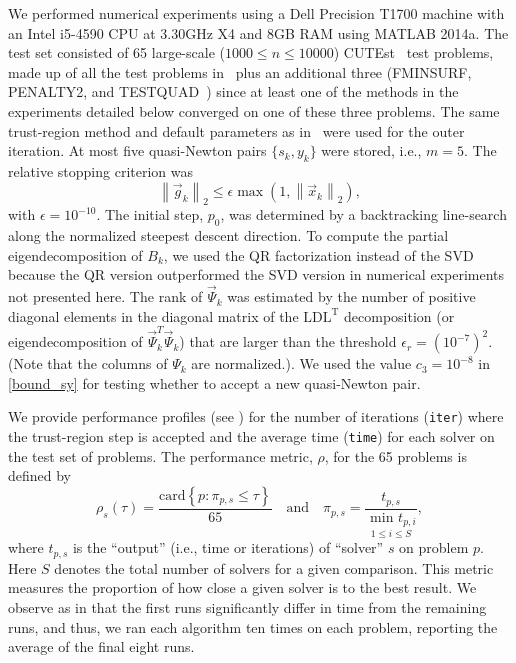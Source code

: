 We performed numerical experiments using a Dell Precision T1700 machine with an Intel i5-4590 {\small CPU} at $3.30${\small GH}z X4 and 8{\small GB RAM} using {\small MATLAB} 2014a.
The test set consisted of 
 65 large-scale ($1000\le n \le 10000$)
{\small CUTE}st~\cite{GouOT03} test problems, made up of all the test problems
in~\cite{BurdakovLMTR16} plus an additional three ({\small FMINSURF},
{\small PENALTY2}, and {\small TESTQUAD}~\cite{GouOT03}) since at least one of the methods
in the experiments detailed below converged on one of these three
problems.  
The same trust-region method and default parameters as
in~\cite[Algorithm 1]{BurdakovLMTR16} were used for the outer iteration.
At most five quasi-Newton pairs $\{ s_k, y_k \}$ were stored,
i.e., $m = 5$.
The relative stopping criterion was 
$$ \left\| \vec{g}_k \right\|_2 \le \epsilon \max \left( 1,
  \left\| \vec{x}_k \right\|_2 \right), $$ 
with $\epsilon=10^{-10}$.  The
initial step, $p_0$, was determined by a backtracking line-search along the
normalized steepest descent direction.  
To compute the partial eigendecomposition of $B_k$, we used the {\small QR} factorization
instead of the {\small SVD} because the  {\small QR} version outperformed the {\small SVD} 
version in numerical experiments not presented here.
The rank of $ \vec{\Psi}_k $ was
estimated by the number of positive diagonal elements in the diagonal
matrix of the $\text{LDL}^{\text{T}}$ decomposition (or eigendecomposition
of $ \vec{\Psi}^T_k \vec{\Psi}_k $) that are larger than the threshold $
\epsilon_r = (10^{-7})^2 $. (Note that the columns of $\Psi_k$
are normalized.). We used the value $c_3 = 10^{-8}$ in \eqref{bound_sy}
for testing whether to accept a new quasi-Newton pair.

We provide performance profiles (see \cite{DolanMore02}) for the number of
iterations (\texttt{iter}) where the trust-region step is 
accepted
and the average time (\texttt{time}) for each
solver on the test set of problems.  The performance metric, $ \rho $, for
the 65 problems is defined by
	\begin{equation*}
		\rho_s(\tau) = \frac{\text{card}\left\{ p : \pi_{p,s} \le \tau \right\}}{65} \quad \text{and} \quad \pi_{p,s} = \frac{t_{p,s}}{ \underset{1\le i \le S}{\text{ min } t_{p,i}} },
	\end{equation*} 
	where $ t_{p,s}$ is the ``output'' (i.e., time or iterations) of
        ``solver'' $s$ on problem $p$. Here $ S $ denotes the total number of solvers for a given comparison. This metric measures
        the proportion of how close a given solver is to the best
        result.  We observe as in \cite{BurdakovLMTR16} that the first runs
        significantly differ in time from the remaining runs, and thus, we
        ran each algorithm ten times on each problem, reporting the average
        of the final eight runs.

